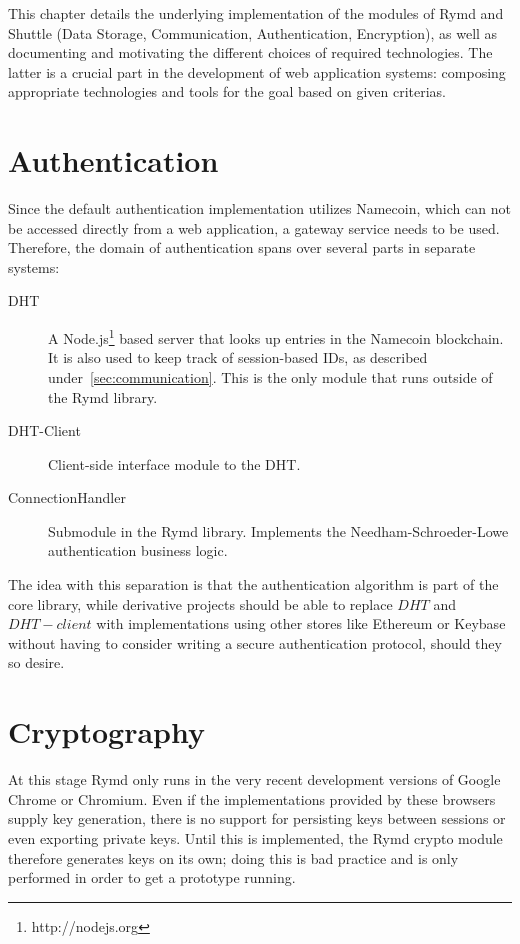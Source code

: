 
This chapter details the underlying implementation of the modules of Rymd and Shuttle (Data Storage, Communication, Authentication, Encryption), as well as documenting and motivating the different choices of required technologies. The latter is a crucial part in the development of web application systems: composing appropriate technologies and tools for the goal based on given criterias.

\section{Authentication}
Since the default authentication implementation utilizes Namecoin, which can not be accessed directly from a web application, a gateway service needs to be used. Therefore, the domain of authentication spans over several parts in separate systems:
\begin{description}
  \item[DHT] A Node.js\footnote{http://nodejs.org} based server that looks up entries in the Namecoin blockchain. It is also used to keep track of session-based IDs, as described under~\ref{sec:communication}. This is the only module that runs outside of the Rymd library.
  \item[DHT-Client] Client-side interface module to the DHT.
  \item[ConnectionHandler] Submodule in the Rymd library. Implements the Needham-Schroeder-Lowe authentication business logic.
\end{description}

The idea with this separation is that the authentication algorithm is part of the core library, while derivative projects should be able to replace $DHT$ and $DHT-client$ with implementations using other stores like Ethereum or Keybase without having to consider writing a secure authentication protocol, should they so desire.

\section{Cryptography}
\label{sec:cryptography}
At this stage Rymd only runs in the very recent development versions of Google Chrome or Chromium.
Even if the implementations provided by these browsers supply key generation, there is no support for persisting keys between sessions or even exporting private keys. Until this is implemented, the Rymd crypto module therefore generates keys on its own; doing this is bad practice and is only performed in order to get a prototype running.

